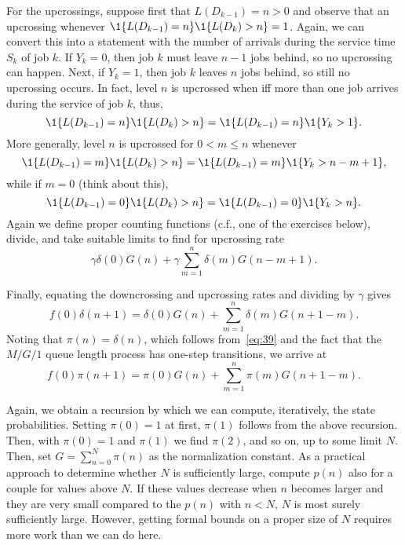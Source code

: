 For the upcrossings, suppose first that $L(D_{k-1})=n>0$ and observe
that an upcrossing whenever $\1{L(D_{k-1})=n} \1{L(D_{k})>n} = 1$.
Again, we can convert this into a statement with the number of
arrivals during the service time $S_k$ of job $k$.  If $Y_k=0$, then
job $k$ must leave $n-1$ jobs behind, so no upcrossing can
happen. Next, if $Y_k=1$, then job $k$ leaves $n$ jobs behind, so
still no upcrossing occurs. In fact, level $n$ is upcrossed when iff
more than one job arrives during the service of job $k$, thus,
\begin{equation*}
\1{L(D_{k-1})=n} \1{L(D_{k})>n} = \1{L(D_{k-1})=n} \1{Y_{k}>1}.
\end{equation*}
More generally, level $n$ is upcrossed for $0<m\leq n$ whenever
\begin{equation*}
\1{L(D_{k-1})=m} \1{L(D_{k})>n} = \1{L(D_{k-1})=m} \1{Y_{k}>n-m+1},
\end{equation*}
while if $m=0$ (think about this),
\begin{equation*}
\1{L(D_{k-1})=0} \1{L(D_{k})>n} = \1{L(D_{k-1})=0} \1{Y_{k}>n}.
\end{equation*}
Again we define proper counting functions (c.f., one of the exercises
below), divide, and take suitable limits to find for upcrossing rate
\begin{equation}\label{eq:555}
\gamma \delta(0) G(n) + \gamma \sum_{m=1}^n \delta(m) G(n-m+1).
\end{equation}

Finally, equating the downcrossing and upcrossing rates and dividing
by $\gamma$ gives
\begin{equation}\label{eq:72}
  f(0) \delta(n+1) = \delta(0) G(n) + \sum_{m=1}^{n} \delta(m) G(n+1-m).
\end{equation}
Noting that $\pi(n) = \delta(n)$, which follows from~\eqref{eq:39} and
the fact that the $M/G/1$ queue length process has one-step
transitions, we arrive at
\begin{equation*}
  f(0) \pi(n+1) = \pi(0) G(n) + \sum_{m=1}^{n} \pi(m) G(n+1-m).
\end{equation*}

Again, we obtain a recursion by which we can compute, iteratively, the
state probabilities.  Setting $\pi(0)=1$ at first, $\pi(1)$ follows
from the above recursion. Then, with $\pi(0)=1$ and $\pi(1)$ we find
$\pi(2)$, and so on, up to some limit $N$. Then, set
$G=\sum_{n=0}^N \pi(n)$ as the normalization constant. As a practical
approach to determine whether $N$ is sufficiently large, compute
$p(n)$ also for a couple for values above $N$. If these values
decrease when $n$ becomes larger and they are very small compared to
the $p(n)$ with $n<N$, $N$ is most surely sufficiently large. However,
getting formal bounds on a proper size of $N$ requires more work than
we can do here.


